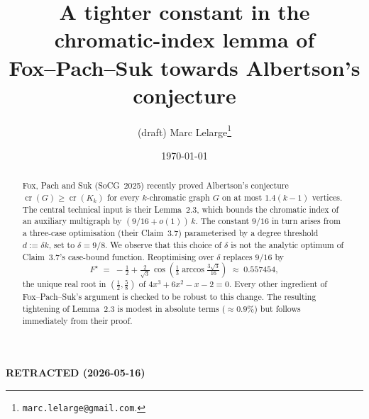 \documentclass[11pt,a4paper]{article}
\title{A tighter constant in the chromatic-index lemma of\\
       Fox--Pach--Suk towards Albertson's conjecture}
\author{(draft) Marc Lelarge\thanks{\texttt{marc.lelarge@gmail.com}.}}
\date{\today}
\theoremstyle{definition}
\DeclareMathOperator{\crN}{cr}
\begin{document}
\begin{center}
{\Large\bfseries RETRACTED (2026-05-16)}\\[1em]
\fbox{\parbox{0.9\textwidth}{\itshape
The main theorem of this note is \textbf{false}.  The proof of
Lemma~6 (\emph{Case 2b}) silently assumed that the FPS monotonicity
of $f_{2b}(\eta,\delta)$ in $\eta$ on $[1/2, \eta_b(\delta))$ holds at
every $\delta > 1$.  In fact it holds only for $\delta \ge -3 + \sqrt{17}
\approx 1.12311$; at the proposed
$\delta_1 \approx 1.114907$, $f_{2b}^{\max}(\delta_1)
\approx 0.5654 > 9/16$, so $F(\delta_1) > F(9/8) = 9/16$ and no
improvement is obtained.\\[0.6em]
The corrected analysis shows that FPS's choice $\delta = 9/8$ is
structurally forced and that $F(\delta)$ attains its minimum at this
value, with $F(9/8) = 9/16$.  See the companion note
\texttt{sharpness\_9\_8.tex} for the corrected statement.\\[0.6em]
The original (false) draft is preserved below for historical record.
}}
\end{center}
\vspace{2em}

\maketitle

\begin{abstract}
Fox, Pach and Suk (SoCG~2025) recently proved Albertson's conjecture
$\crN(G)\ge\crN(K_k)$ for every $k$-chromatic graph $G$ on at most
$1.4(k-1)$ vertices. The central technical input is their Lemma~2.3,
which bounds the chromatic index of an auxiliary multigraph by
$(9/16+o(1))\,k$. The constant $9/16$ in turn arises from a three-case
optimisation (their Claim~3.7) parameterised by a degree threshold
$d:=\delta k$, set to $\delta=9/8$. We observe that this choice of
$\delta$ is not the analytic optimum of Claim~3.7's
case-bound function. Reoptimising over $\delta$ replaces $9/16$ by
\[
   F^{\star} \;=\; -\tfrac{1}{2}+\tfrac{2}{\sqrt3}\,
                   \cos\!\left(\tfrac{1}{3}\arccos\tfrac{3\sqrt3}{16}\right)
            \;\approx\; 0.557454,
\]
the unique real root in $(\tfrac12,\tfrac58)$ of $4x^3+6x^2-x-2=0$.
Every other ingredient of Fox--Pach--Suk's argument is checked to be
robust to this change. The resulting tightening of Lemma~2.3 is modest
in absolute terms ($\approx0.9\%$) but follows immediately from their
proof.
\end{abstract}
\end{document}
